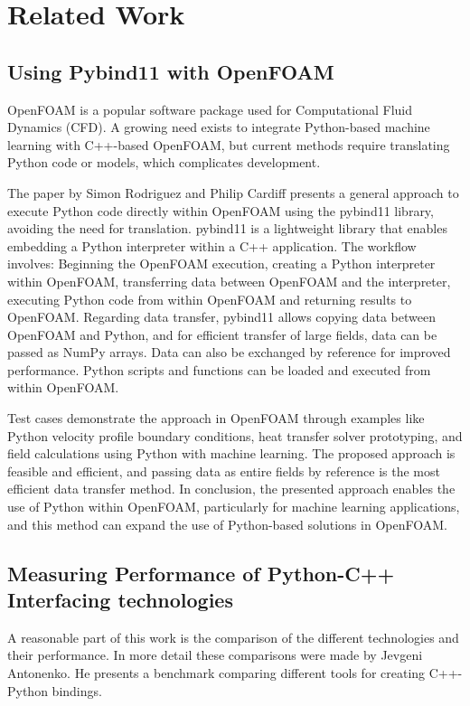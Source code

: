 \chapter{Related Work}\label{chapter:Related Work}

\section{Using Pybind11 with OpenFOAM}\label{sec:using-pybind11-in-openfoam} 

OpenFOAM is a popular software package used for Computational Fluid Dynamics (CFD). A growing need exists to integrate Python-based machine learning with C++-based OpenFOAM, but current methods require translating Python code or models, which complicates development. 

The paper by Simon Rodriguez and Philip Cardiff presents a general approach to execute Python code directly within OpenFOAM using the pybind11 library, avoiding the need for translation. pybind11 is a lightweight library that enables embedding a Python interpreter within a C++ application. The workflow involves: Beginning the OpenFOAM execution, creating a Python interpreter within OpenFOAM, transferring data between OpenFOAM and the interpreter, executing Python code from within OpenFOAM and returning results to OpenFOAM. Regarding data transfer, pybind11 allows copying data between OpenFOAM and Python, and for efficient transfer of large fields, data can be passed as NumPy arrays. Data can also be exchanged by reference for improved performance. Python scripts and functions can be loaded and executed from within OpenFOAM. 

Test cases demonstrate the approach in OpenFOAM through examples like Python velocity profile boundary conditions, heat transfer solver prototyping, and field calculations using Python with machine learning. The proposed approach is feasible and efficient, and passing data as entire fields by reference is the most efficient data transfer method. In conclusion, the presented approach enables the use of Python within OpenFOAM, particularly for machine learning applications, and this method can expand the use of Python-based solutions in OpenFOAM.

\section{Measuring Performance of Python-C++ Interfacing technologies}

A reasonable part of this work is the comparison of the different technologies and their performance. In more detail these comparisons were made by Jevgeni Antonenko. He presents a benchmark comparing different tools for creating C++-Python bindings. 


